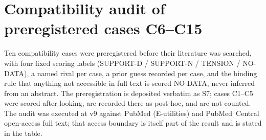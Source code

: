 \documentclass[9pt,twocolumn]{article}
\begin{document}
\section{Compatibility audit of preregistered cases C6--C15}
\label{sec:audit}
Ten compatibility cases were preregistered before their literature was searched, with four fixed scoring labels (SUPPORT-D / SUPPORT-N / TENSION / NO-DATA), a named rival per case, a prior guess recorded per case, and the binding rule that anything not accessible in full text is scored NO-DATA, never inferred from an abstract. The preregistration is deposited verbatim as S7; cases C1--C5 were scored after looking, are recorded there as post-hoc, and are not counted. The audit was executed at v9 against PubMed (E-utilities) and PubMed~Central open-access full text; that access boundary is itself part of the result and is stated in the table.
\end{document}

